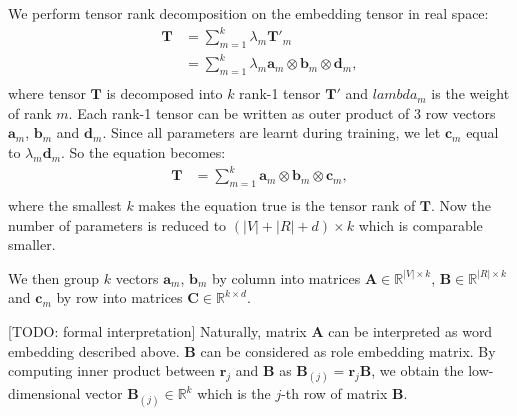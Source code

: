 \documentclass[a4paper]{article}
\begin{document}
We perform tensor rank decomposition \citep{hitchcock1927expression} on the embedding tensor in real space:
\begin{equation} \label{eq:trd_org}
\begin{aligned}
    \mathbf{T}   
        &= \sum_{m=1}^{k} \lambda_m \mathbf{T}'_m \\
        &= \sum_{m=1}^{k} \lambda_m \mathbf{a}_m \otimes \mathbf{b}_m \otimes \mathbf{d}_m, \\
\end{aligned}
\end{equation}
where tensor $\mathbf{T}$ is decomposed into $k$ rank-1 tensor $\mathbf{T}'$ and $lambda_m$ is the weight of rank $m$. Each rank-1 tensor can be written as outer product of 3 row vectors $\mathbf{a}_m$, $\mathbf{b}_m$ and $\mathbf{d}_m$. Since all parameters are learnt during training, we let $\mathbf{c}_m$ equal to $\lambda_m \mathbf{d}_m$. So the equation becomes:
\begin{equation} \label{eq:trd}
\begin{aligned}
    \mathbf{T}   
        &= \sum_{m=1}^{k} \mathbf{a}_m \otimes \mathbf{b}_m \otimes \mathbf{c}_m, \\
\end{aligned}
\end{equation}
where the smallest $k$ makes the equation true is the tensor rank of $\mathbf{T}$. Now the number of parameters is reduced to $(|V| + |R| + d) \times k$ which is comparable smaller. 

We then group $k$ vectors $\mathbf{a}_m$, $\mathbf{b}_m$ by column into matrices $\mathbf{A} \in \mathbb{R}^{|V| \times k}$, $\mathbf{B} \in \mathbb{R}^{|R| \times k}$ and $\mathbf{c}_m$ by row into matrices $\mathbf{C} \in \mathbb{R}^{k \times d}$. 

[TODO: formal interpretation] Naturally, matrix $\mathbf{A}$ can be interpreted as word embedding described above. $\mathbf{B}$ can be considered as role embedding matrix. By computing inner product between $\mathbf{r}_j$ and $\mathbf{B}$ as $\mathbf{B}_{(j)} = \mathbf{r}_j \mathbf{B}$, we obtain the low-dimensional vector $\mathbf{B}_{(j)} \in \mathbb{R}^k$ which is the $j$-th row of matrix $\mathbf{B}$. 
\end{document}
